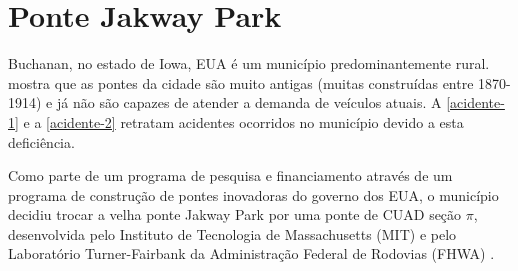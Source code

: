 \section{Ponte Jakway Park}
\label{chap:jakway}

%
%
%

Buchanan, no estado de Iowa, EUA é um município predominantemente rural.  mostra que as pontes da cidade são muito antigas (muitas construídas entre 1870-1914) e já não são capazes de atender a demanda de veículos atuais. A  \autoref{acidente-1} e a \autoref{acidente-2} retratam acidentes ocorridos no município devido a esta deficiência.


Como parte de um programa de pesquisa e financiamento através de um programa de construção de pontes inovadoras do governo dos EUA, o município decidiu trocar a velha ponte Jakway Park por uma ponte de CUAD seção $ \pi $, desenvolvida pelo Instituto de Tecnologia de Massachusetts (MIT) e pelo Laboratório Turner-Fairbank da Administração Federal de Rodovias (FHWA) \cite{Keierbeler_et_al}.

